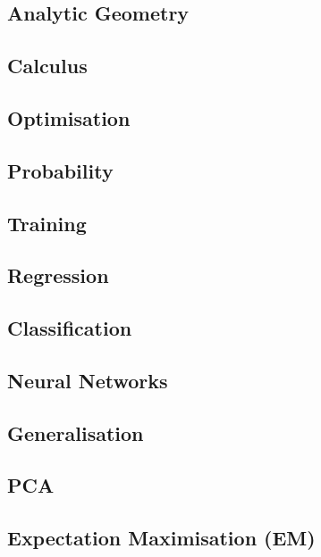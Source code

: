 \documentclass[9pt]{extarticle}
\begin{document}
  \begin{multicols}{2}
  \subsection*{Analytic Geometry}
  

  \subsection*{Calculus}
  

  \subsection*{Optimisation}
  

  \subsection*{Probability}
  

  \subsection*{Training}
  

  \subsection*{Regression}
  

  \subsection*{Classification}
  

  \subsection*{Neural Networks}
  
  

  \subsection{Generalisation}
  

  \subsection{PCA}
  
  \subsection*{Expectation Maximisation (EM)}
  

  \end{multicols}
\end{document}
